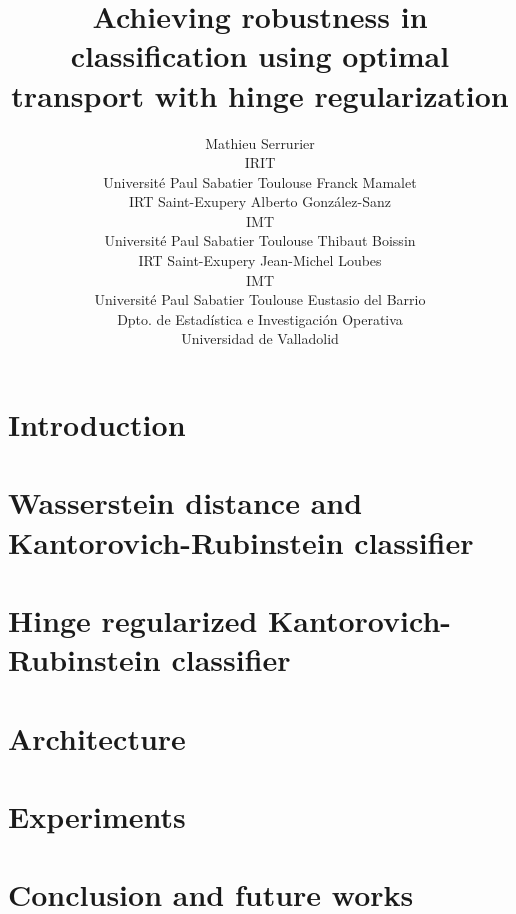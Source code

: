 \documentclass{article}
\begin{document}
\title{Achieving robustness in classification using optimal transport with hinge regularization}
\author{%
  Mathieu Serrurier\\
  IRIT\\
  Université Paul Sabatier Toulouse
  \And
  Franck Mamalet\\
  IRT Saint-Exupery
  \And
  Alberto González-Sanz\\
  IMT\\
  Université Paul Sabatier Toulouse
  \And
  Thibaut Boissin\\
  IRT Saint-Exupery
  \And
  Jean-Michel Loubes \\
  IMT\\
  Université Paul Sabatier Toulouse
  \And
  Eustasio del Barrio \\
  Dpto. de Estadística e Investigación Operativa\\
  Universidad de Valladolid
  
}
\maketitle
\begin{abstract}

\end{abstract}


\section{Introduction}
\label{sec:intro}



\section{Wasserstein distance and Kantorovich-Rubinstein classifier}
\label{sec:wass_distance}



\section{Hinge regularized Kantorovich-Rubinstein classifier }
\label{sec:kr_hinge}


\section{Architecture}
\label{sec:lip_const}


\section{Experiments}
\label{sec:experimentation}


\section{Conclusion and future works}
\label{sec:conclusion}



 
\newpage

\end{document}
